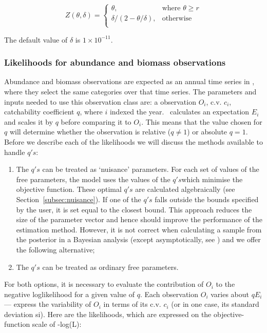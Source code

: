 {{{{\begin{equation}
Z \left(\theta,\delta \right) = \begin{cases}
\theta, & \text{where $\theta \ge r$} \\
\delta/\left( 2-\theta/\delta \right), & \text{otherwise} \\  
\end{cases}
\end{equation}

The default value of $\delta$ is $1 \times 10^{-11}$.

\subsubsection{Likelihoods for abundance and biomass observations}\label{Obs:biomass}
Abundance and biomass observations are expected as an annual time series in \CNAME, where they select the same categories over that time series. The parameters and inputs needed to use this observation class are: a observation $O_i$, c.v. $c_i$, catchability coefficient $q$, where $i$ indexed the year. \CNAME\ calculates an expectation $E_i$ and scales it by $q$ before comparing it to $O_i$. This means that the value chosen for $q$ will determine whether the observation is relative ($q\neq 1$) or absolute $q = 1$. Before we describe each of the likelihoods we will discuss the methods available to handle $q's$:

\begin{enumerate}
	\item The $q's$ can be treated as ‘nuisance’ parameters. For each set of values of the free parameters, the model uses the values of the $q's$which minimise the objective function. These optimal $q's$ are calculated algebraically (see Section~\ref{subsec:nuisance}). If one of the $q's$ falls outside the bounds specified by the user, it is set equal to the closest bound. This approach reduces the size of the parameter vector and hence should improve the performance of the estimation method. However, it is not correct when calculating a sample from the posterior in a Bayesian analysis (except asymptotically, see \cite{Walters_ludwig_94}) and we offer the following alternative;
	
	\item The $q's$ can be treated as ordinary free parameters.
\end{enumerate}	
	
For both options, it is necessary to evaluate the contribution of $O_i$ to the negative loglikelihood for a given value of $q$. Each observation $O_i$ varies about $qE_i$ — express the variability of $O_i$ in terms of its c.v. $c_i$ (or in one case, its standard deviation si). Here are the likelihoods, which are expressed on the objective-function scale of -log(L):


}}}}
